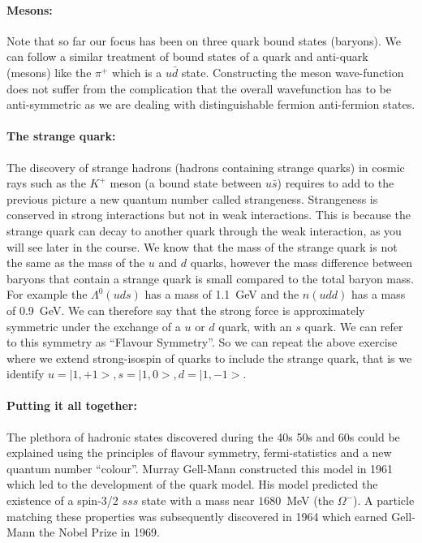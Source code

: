 \paragraph{Mesons:} Note that so far our focus has been on three quark bound states (baryons). We can follow a similar treatment of bound states of a quark and anti-quark (mesons) like the $\pi^+$ which is a $u\bar{d}$ state. Constructing the meson wave-function does not suffer from the complication that the overall wavefunction has to be anti-symmetric as we are dealing with distinguishable fermion anti-fermion states.

\paragraph{The strange quark:}
The discovery of strange hadrons (hadrons containing strange quarks) in cosmic rays such as the $K^+$ meson (a bound state between $u\bar{s}$) requires to add to the previous picture a new quantum number called strangeness. Strangeness is conserved in strong interactions but not in weak interactions. This is because the strange quark can decay to another quark through the weak interaction, as you will see later in the course. We know that the mass of the strange quark is not the same as the mass of the $u$ and $d$ quarks, however the mass 
difference between baryons that contain a strange quark is small compared to the total baryon mass. For example the $\Lambda^{0} (uds)$ has a mass of 1.1~GeV and the $n(udd)$  has a mass of 0.9~GeV. We can therefore say that the strong force is approximately symmetric under the exchange of a $u$ or $d$ quark, with an $s$ quark. We can refer to this symmetry as ``Flavour Symmetry''.
So we can repeat the above exercise where we extend strong-isospin of quarks to include the strange quark, that is we identify
$u=|1,+1>,s=|1,0>,d=|1,-1>$. 

\paragraph{Putting it all together:}
The plethora of hadronic states discovered during the 40s 50s and 60s could be explained using the principles of flavour symmetry, fermi-statistics and a new quantum number ``colour''. Murray Gell-Mann constructed this model in 1961 which led to the development of the quark model. His model predicted the existence of a spin-3/2 $sss$ state with a mass near $1680$~MeV (the $\Omega^-$). A particle matching these properties was subsequently discovered in 1964 which earned Gell-Mann the Nobel Prize in 1969.

